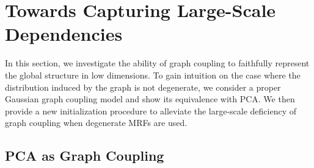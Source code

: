 \section{Towards Capturing Large-Scale Dependencies}\label{sec:towards_large_scale}

In this section, we investigate the ability of graph coupling to faithfully represent the global structure in low dimensions. To gain intuition on the case where the distribution induced by the graph is not degenerate, we consider a proper Gaussian graph coupling model and show its equivalence with PCA. We then provide a new initialization procedure to alleviate the large-scale deficiency of graph coupling when degenerate MRFs are used.

\subsection{PCA as Graph Coupling}

